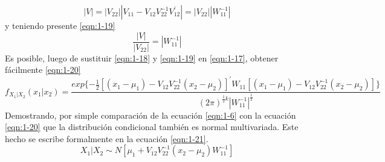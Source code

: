 \begin{equation}
    \left|V\right|=\left|V_{22}\right|\left|V_{11}-V_{12}V_{22}^{-1}V_{12}^\prime\right|=\left|V_{22}\right|\left|W_{11}^{-1}\right|
    \label{eqn:1-18}
\end{equation}
y teniendo presente \ref{eqn:1-19}
\begin{equation}
    \frac{\left|V\right|}{\left|V_{22}\right|}=\left|W_{11}^{-1}\right|
    \label{eqn:1-19}
\end{equation}
Es posible, luego de sustituir \ref{eqn:1-18} y \ref{eqn:1-19} en \ref{eqn:1-17}, obtener fácilmente \ref{eqn:1-20}
\begin{equation}
    f_{X_1|X_2}(x_1|x_2)=\frac{exp{\{-\frac{1}{2}[(x_1-\mu_1)-V_{12}V_{22}^{-1}(x_2-\mu_2)]^\prime W_{11}[(x_1-\mu_1)-V_{12}V_{22}^{-1}(x_2-\mu_2)]\}}}{(2\pi)^{\frac{1}{2}k}|W_{11}^{-1}|^\frac{1}{2}}
    \label{eqn:1-20}
\end{equation}
Demostrando, por simple comparación de la ecuación \ref{eqn:1-6} con la ecuación \ref{eqn:1-20} que la distribución condicional también es normal multivariada.   Este hecho se escribe formalmente en la ecuación \ref{eqn:1-21}.
\begin{equation}
    \left.X_1\right|X_2\sim N\left[\mu_1+V_{12}V_{22}^{-1}\left(x_2-\mu_2\right)W_{11}^{-1}\right]
    \label{eqn:1-21}
\end{equation}
